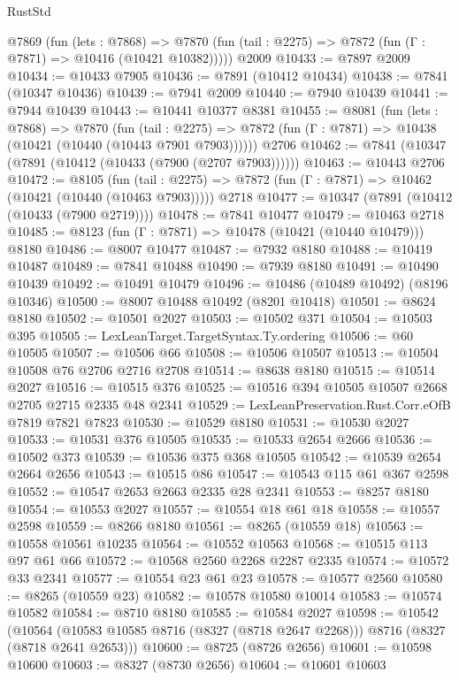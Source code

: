 \begin{lexlean}{RustStd}
\begin{coremodule}
    @7869
      (fun (lets : @7868) =>
      @7870 (fun (tail : @2275) => @7872 (fun (Γ : @7871) => @10416 (@10421 @10382)))))
    @2009
@10433 := @7897 @2009
@10434 := @10433 @7905
@10436 := @7891 (@10412 @10434)
@10438 := @7841 (@10347 @10436)
@10439 := @7941 @2009
@10440 := @7940 @10439
@10441 := @7944 @10439
@10443 := @10441 @10377 @8381
@10455 := @8081
    (fun (lets : @7868) =>
    @7870
      (fun (tail : @2275) =>
      @7872 (fun (Γ : @7871) => @10438 (@10421 (@10440 (@10443 @7901 @7903))))))
    @2706
@10462 := @7841 (@10347 (@7891 (@10412 (@10433 (@7900 (@2707 @7903))))))
@10463 := @10443 @2706
@10472 := @8105
    (fun (tail : @2275) => @7872 (fun (Γ : @7871) => @10462 (@10421 (@10440 (@10463 @7903)))))
    @2718
@10477 := @10347 (@7891 (@10412 (@10433 (@7900 @2719))))
@10478 := @7841 @10477
@10479 := @10463 @2718
@10485 := @8123 (fun (Γ : @7871) => @10478 (@10421 (@10440 @10479))) @8180
@10486 := @8007 @10477
@10487 := @7932 @8180
@10488 := @10419 @10487
@10489 := @7841 @10488
@10490 := @7939 @8180
@10491 := @10490 @10439
@10492 := @10491 @10479
@10496 := @10486 (@10489 @10492) (@8196 @10346)
@10500 := @8007 @10488 @10492 (@8201 @10418)
@10501 := @8624 @8180
@10502 := @10501 @2027
@10503 := @10502 @371
@10504 := @10503 @395
@10505 := LexLeanTarget.TargetSyntax.Ty.ordering
@10506 := @60 @10505
@10507 := @10506 @66
@10508 := @10506 @10507
@10513 := @10504 @10508 @76 @2706 @2716 @2708
@10514 := @8638 @8180
@10515 := @10514 @2027
@10516 := @10515 @376
@10525 := @10516 @394 @10505 @10507 @2668 @2705 @2715 @2335 @48 @2341
@10529 := LexLeanPreservation.Rust.Corr.eOfB @7819 @7821 @7823
@10530 := @10529 @8180
@10531 := @10530 @2027
@10533 := @10531 @376 @10505
@10535 := @10533 @2654 @2666
@10536 := @10502 @373
@10539 := @10536 @375 @368 @10505
@10542 := @10539 @2654 @2664 @2656
@10543 := @10515 @86
@10547 := @10543 @115 @61 @367 @2598
@10552 := @10547 @2653 @2663 @2335 @28 @2341
@10553 := @8257 @8180
@10554 := @10553 @2027
@10557 := @10554 @18 @61 @18
@10558 := @10557 @2598
@10559 := @8266 @8180
@10561 := @8265 (@10559 @18)
@10563 := @10558 @10561 @10235
@10564 := @10552 @10563
@10568 := @10515 @113 @97 @61 @66
@10572 := @10568 @2560 @2268 @2287 @2335
@10574 := @10572 @33 @2341
@10577 := @10554 @23 @61 @23
@10578 := @10577 @2560
@10580 := @8265 (@10559 @23)
@10582 := @10578 @10580 @10014
@10583 := @10574 @10582
@10584 := @8710 @8180
@10585 := @10584 @2027
@10598 := @10542
    (@10564 (@10583 @10585 @8716 (@8327 (@8718 @2647 @2268))) @8716 (@8327 (@8718 @2641 @2653)))
@10600 := @8725 (@8726 @2656)
@10601 := @10598 @10600
@10603 := @8327 (@8730 @2656)
@10604 := @10601 @10603

\end{coremodule}
\end{lexlean}
